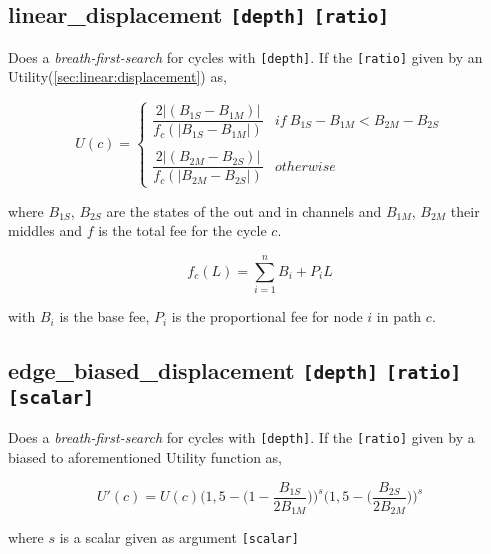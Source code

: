 \subsection*{linear\_displacement \texttt{[depth]} \texttt{[ratio]}}

Does a \textit{breath-first-search} for cycles with \texttt{[depth]}. If the \texttt{[ratio]} given by an Utility(\ref{sec:linear:displacement}) as,

\[ U(c) = \begin{cases} 
\dfrac{2|(B_{1S} - B_{1M})|}{f_c(|B_{1S} - B_{1M}|)}  & if~B_{1S} - B_{1M} < B_{2M} - B_{2S} \\ 
\\
\dfrac{2|(B_{2M} - B_{2S})|}{f_c(|B_{2M} - B_{2S}|)}  & otherwise
\end{cases} \]

where $B_{1S}$, $B_{2S}$ are the states of the out and in channels and $B_{1M}$, $B_{2M}$ their middles and $f$ is the total fee for the cycle $c$. 

\[f_c(L) = \sum_{i=1}^{n} B_i + P_iL \]

with $B_i$ is the base fee, $P_i$ is the proportional fee for node $i$ in path $c$.

\subsection*{edge\_biased\_displacement \texttt{[depth]} \texttt{[ratio]} \texttt{[scalar]}}

Does a \textit{breath-first-search} for cycles with \texttt{[depth]}. If the \texttt{[ratio]} given by a biased to aforementioned Utility function as,

\[ U'(c) = U(c) \bigg(1,5 - \big(1 - \dfrac{B_{1S}}{2B_{1M}}\big) \bigg)^s \bigg(1,5 - \big(\dfrac{B_{2S}}{2B_{2M}}\big)\bigg)^s  \]

where $s$ is a scalar given as argument \texttt{[scalar]}
